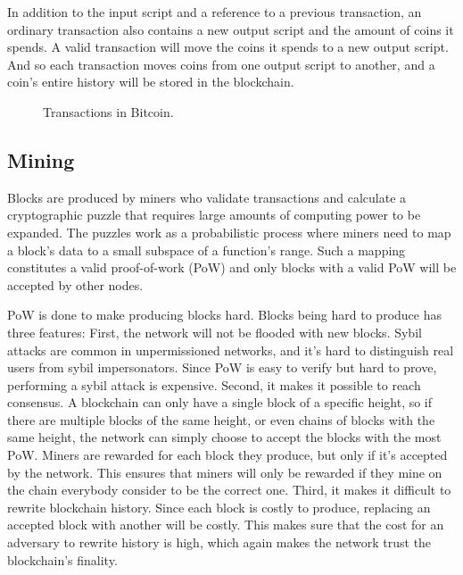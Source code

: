 In addition to the input script and a reference to a previous transaction, an ordinary transaction also contains a new output script and the amount of coins it spends. A valid transaction will move the coins it spends to a new output script. And so each transaction moves coins from one output script to another, and a coin's entire history will be stored in the blockchain. 

\begin{figure}[htbp]
  \centering
  
  \caption{Transactions in Bitcoin.}
  \label{fig:bitcoin-transactions}
\end{figure}

\subsection{Mining}

Blocks are produced by miners who validate transactions and calculate a cryptographic puzzle that requires large amounts of computing power to be expanded. The puzzles work as a probabilistic process where miners need to map a block's data to a small subspace of a function's range. Such a mapping constitutes a valid proof-of-work (PoW) and only blocks with a valid PoW will be accepted by other nodes. 

PoW is done to make producing blocks hard. Blocks being hard to produce has three features: First, the network will not be flooded with new blocks. Sybil attacks are common in unpermissioned networks, and it's hard to distinguish real users from sybil impersonators. Since PoW is easy to verify but hard to prove, performing a sybil attack is expensive. Second, it makes it possible to reach consensus. A blockchain can only have a single block of a specific height, so if there are multiple blocks of the same height, or even chains of blocks with the same height, the network can simply choose to accept the blocks with the most PoW. Miners are rewarded for each block they produce, but only if it's accepted by the network. This ensures that miners will only be rewarded if they mine on the chain everybody consider to be the correct one. Third, it makes it difficult to rewrite blockchain history. Since each block is costly to produce, replacing an accepted block with another will be costly. This makes sure that the cost for an adversary to rewrite history is high, which again makes the network trust the blockchain's finality.

